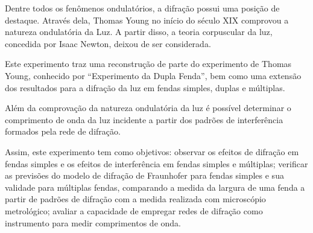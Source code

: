 Dentre todos os fenômenos ondulatórios, a difração possui uma posição de destaque. Através dela, Thomas Young no início do século XIX comprovou a natureza ondulatória da Luz. A partir disso, a teoria corpuscular da luz, concedida por Isaac Newton, deixou de ser considerada. 

Este experimento traz uma reconstrução de parte do experimento de Thomas Young, conhecido por “Experimento da Dupla Fenda”, bem como uma extensão dos resultados para a difração da luz em fendas simples, duplas e múltiplas. 

Além da comprovação da natureza ondulatória da luz é possível determinar o comprimento de onda da luz incidente a partir dos padrões de interferência formados pela rede de difração. 

Assim, este experimento tem como objetivos: observar os efeitos de difração em fendas simples e os efeitos de interferência em fendas simples e múltiplas; verificar as previsões do modelo de difração de Fraunhofer para fendas simples e sua validade para múltiplas fendas, comparando a medida da largura de uma fenda a partir de padrões de difração com a medida realizada com microscópio metrológico; avaliar a capacidade de empregar redes de difração como instrumento para medir comprimentos de onda.

